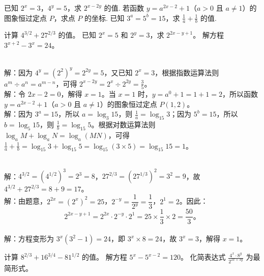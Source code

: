 





\begin{Exercise}[title={指数运算小练习}, label={ex:exponent},difficulty = 3]
    \Question 已知 $2^x = 3$，$4^y = 5$，求 $2^{x - 2y}$ 的值.
    \Question 若函数 $y = a^{2x - 2}+1$（$a>0$ 且 $a\neq1$）的图象恒过定点 $P$，求点 $P$ 的坐标.
    \Question 已知 $3^a = 5^b = 15$，求 $\frac{1}{a}+\frac{1}{b}$ 的值.

    \Question 计算 $4^{3/2} + 27^{2/3}$ 的值。
    \Question 已知 $2^x = 5$ 和 $2^y = 3$，求 $2^{2x - y + 1}$。
    \Question 解方程 $3^{x+2} - 3^x = 24$。
\end{Exercise}

\begin{MyAnswer}[ref={ex:exponent}]
    \Question {}\\ 解：因为 $4^y=(2^2)^y = 2^{2y}=5$，又已知 $2^x = 3$，根据指数运算法则 $a^m\div a^n=a^{m - n}$，可得 $2^{x - 2y}=2^x\div2^{2y}=\frac{3}{5}$。
    \Question {}\\ 解：令 $2x - 2 = 0$，解得 $x = 1$。当 $x = 1$ 时，$y=a^{0}+1=1 + 1=2$，所以函数 $y = a^{2x - 2}+1$（$a>0$ 且 $a\neq1$）的图象恒过定点 $P(1,2)$。
    \Question {}\\ 解：因为 $3^a = 15$，所以 $a=\log_3{15}$，则 $\frac{1}{a}=\log_{15}3$；因为 $5^b = 15$，所以 $b=\log_5{15}$，则 $\frac{1}{b}=\log_{15}5$。根据对数运算法则 $\log_aM+\log_aN=\log_a(MN)$，可得 $\frac{1}{a}+\frac{1}{b}=\log_{15}3+\log_{15}5=\log_{15}(3\times5)=\log_{15}15 = 1$。

    \Question {}\\ 解：$4^{3/2} = (4^{1/2})^3 = 2^3 = 8$，$27^{2/3} = (27^{1/3})^2 = 3^2 = 9$，故 $4^{3/2} + 27^{2/3} = 8 + 9 = 17$。
    \Question {}\\ 解：由题意，$2^{2x} = (2^x)^2 = 25$，$2^{-y} = \dfrac{1}{2^y} = \dfrac{1}{3}$，$2^1 = 2$。因此：
    $$
    2^{2x - y + 1} = 2^{2x} \cdot 2^{-y} \cdot 2^1 = 25 \times \dfrac{1}{3} \times 2 = \dfrac{50}{3} 。
    $$
    \Question {}\\ 解：方程变形为 $3^x (3^2 - 1) = 24$，即 $3^x \times 8 = 24$，故 $3^x = 3$，解得 $x = 1$。
\end{MyAnswer}

\begin{Exercise}[title={指数运算小练习2}, label={ex:exponent2},difficulty = 2]
    \Question 计算 $8^{2/3} + 16^{3/4} - 81^{1/2}$ 的值。
    \Question 解方程 $5^{x} - 5^{x-2} = 120$。
    \Question 化简表达式 $\frac{4^{x} \cdot 8^{y}}{2^{2x + 3y}}$ 为最简形式。
\end{Exercise}



